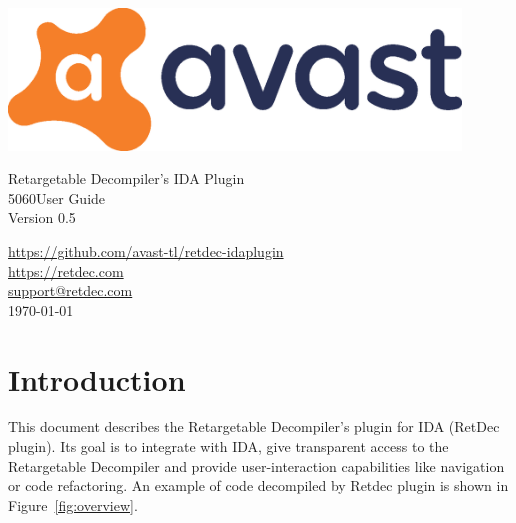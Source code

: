 \documentclass[pdftex, a4paper,12pt, oneside, svgnames]{article}
\makeatletter
\newcommand\HUGE{\@setfontsize\Huge{50}{60}}
\makeatother
\begin{document}

\begin{titlepage}
\begin{center}


\includegraphics[width=12cm]{figures/avast-logo-cmyk}

\vfill

{\LARGE Retargetable Decompiler's IDA Plugin}
\\[5 mm]
{\HUGE User Guide}
\\[3 mm]
{\large Version 0.5}

\vfill

{\LARGE
\href{https://github.com/avast-tl/retdec-idaplugin}{https://github.com/avast-tl/retdec-idaplugin} \\[2 mm]
\href{https://retdec.com}{https://retdec.com} \\[2 mm]
\href{mailto:support@retdec.com}{support@retdec.com} \\[4 mm]
\today}

\end{center}
\end{titlepage}


\tableofcontents

\newpage
\section{Introduction}
\label{sec:introduction}
This document describes the Retargetable Decompiler's plugin for IDA (RetDec plugin). Its goal is to integrate with IDA, give transparent access to the Retargetable Decompiler and provide user-interaction capabilities like navigation or code refactoring. An example of code decompiled by Retdec plugin is shown in Figure~\ref{fig:overview}.
\end{document}
